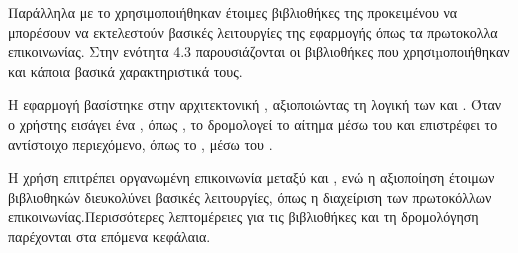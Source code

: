 Παράλληλα με το  χρησιμοποιήθηκαν έτοιμες βιβλιοθήκες της  προκειμένου να μπορέσουν να εκτελεστούν βασικές λειτουργίες της εφαρμογής όπως 
τα πρωτοκολλα επικοινωνίας. Στην ενότητα 4.3 παρουσιάζονται οι βιβλιοθήκες που χρησιµοποιήθηκαν και κάποια βασικά χαρακτηριστικά τους.

Η εφαρμογή βασίστηκε στην αρχιτεκτονική , αξιοποιώντας τη λογική των  και . Όταν ο χρήστης εισάγει ένα , όπως , το  δρομολογεί το αίτημα μέσω του  και επιστρέφει το αντίστοιχο περιεχόμενο, όπως το , μέσω του .

Η χρήση  επιτρέπει οργανωμένη επικοινωνία μεταξύ  και , ενώ η αξιοποίηση έτοιμων  βιβλιοθηκών διευκολύνει βασικές λειτουργίες, όπως η διαχείριση των πρωτοκόλλων επικοινωνίας.Περισσότερες λεπτομέρειες για τις βιβλιοθήκες και τη δρομολόγηση παρέχονται στα επόμενα κεφάλαια.




